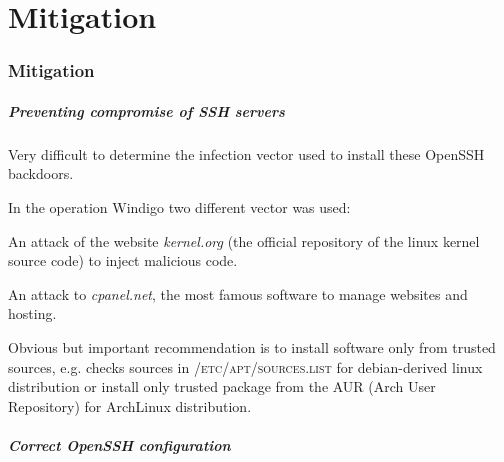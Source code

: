 \part{Mitigation}
\section{Mitigation}

\begin{frame}
	\partpage
\end{frame}

\begin{frame}
	\frametitle{Preventing compromise of SSH servers}
	
	
	Very difficult to determine the infection vector used to install these OpenSSH backdoors.
	
	\medskip
	
	In the operation Windigo two different vector was used: 
	
	\smallskip
	
	An attack of the website \textit{kernel.org} (the official repository of the linux kernel source code) to inject malicious code.
	
	\smallskip
	
	An attack to \textit{cpanel.net}, the most famous software to manage websites and hosting.

  \medskip
  
  Obvious but important recommendation is to install software only from trusted sources, e.g. checks sources in \textsc{/etc/apt/sources.list} for debian-derived linux distribution or install only trusted package from the AUR (Arch User Repository) for ArchLinux distribution. 
  	
\end{frame}


\begin{frame}
	\frametitle{Correct OpenSSH configuration}
\end{frame}


